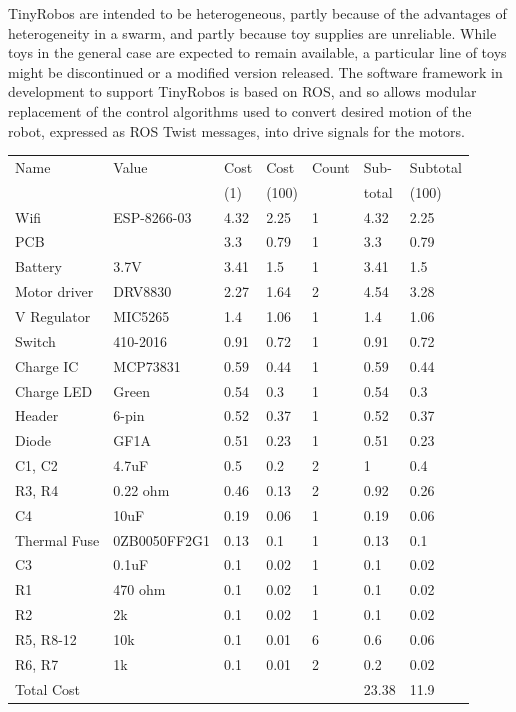 \documentclass[]{article}
\begin{document}
TinyRobos are intended to be heterogeneous, partly because of the advantages of heterogeneity in a swarm, and partly because toy supplies are unreliable.
While toys in the general case are expected to remain available, a particular line of toys might be discontinued or a modified version released. 
The software framework in development to support TinyRobos is based on ROS, and so allows modular replacement of the control algorithms used to convert desired motion of the robot, expressed as ROS Twist messages, into drive signals for the motors. 

 \begin{table}
	\begin{tabular}{l l l l l l l }
	Name & Value & Cost & Cost & Count & Sub- & Subtotal\\
	& & (1) & (100) & & total& (100) \\
	\hline
	Wifi& ESP-8266-03& 4.32 & 2.25 & 1 & 4.32 & 2.25\\
	PCB& & 3.3 & 0.79 & 1 & 3.3 & 0.79\\
	Battery& 3.7V& 3.41 & 1.5 & 1 & 3.41 & 1.5\\
	Motor driver& DRV8830& 2.27 & 1.64 & 2 & 4.54 & 3.28\\
	V Regulator& MIC5265& 1.4 & 1.06 & 1 & 1.4 & 1.06\\
	Switch& 410-2016& 0.91 & 0.72 & 1 & 0.91 & 0.72\\
	Charge IC& MCP73831& 0.59 & 0.44 & 1 & 0.59 & 0.44\\
	Charge LED& Green& 0.54 & 0.3 & 1 & 0.54 & 0.3\\
	Header& 6-pin& 0.52 & 0.37 & 1 & 0.52 & 0.37\\
	Diode& GF1A & 0.51& 0.23 & 1 & 0.51 & 0.23\\
	C1, C2& 4.7uF& 0.5 & 0.2 & 2 & 1 & 0.4\\
	R3, R4& 0.22 ohm& 0.46 & 0.13 & 2 & 0.92 & 0.26\\
	C4& 10uF& 0.19 & 0.06 & 1 & 0.19 & 0.06\\
	Thermal Fuse& 0ZB0050FF2G1& 0.13 & 0.1 & 1 & 0.13 & 0.1\\
	C3& 0.1uF& 0.1 & 0.02 & 1 & 0.1 & 0.02\\
	R1& 470 ohm& 0.1 & 0.02 & 1 & 0.1 & 0.02\\
	R2& 2k & 0.1& 0.02 & 1 & 0.1 & 0.02\\
	R5, R8-12& 10k& 0.1 & 0.01 & 6 & 0.6 & 0.06\\
	R6, R7& 1k& 0.1 & 0.01 & 2 & 0.2 & 0.02\\
	\hline
	Total Cost &  &  &  &  & 23.38 & 11.9\\
 	\end{tabular}
 \end{table}
 
\end{document}
